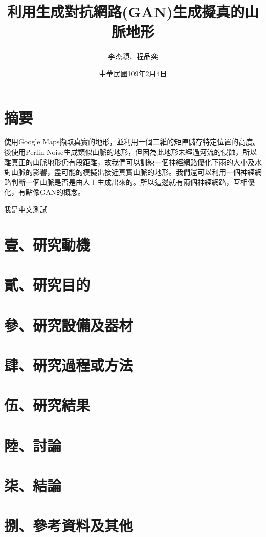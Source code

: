 \documentclass[16pt]{extarticle}
\title{利用生成對抗網路(GAN)生成擬真的山脈地形}
\author{李杰穎、程品奕}
\date{中華民國109年2月4日}
\begin{document}
\maketitle

\section*{摘要}
使用Google Maps擷取真實的地形，並利用一個二維的矩陣儲存特定位置的高度。後使用Perlin Noise生成類似山脈的地形，但因為此地形未經過河流的侵蝕，所以離真正的山脈地形仍有段距離，故我們可以訓練一個神經網路優化下雨的大小及水對山脈的影響，盡可能的模擬出接近真實山脈的地形。我們還可以利用一個神經網路判斷一個山脈是否是由人工生成出來的。所以這邊就有兩個神經網路，互相優化，有點像GAN的概念。

我是中文測試
\section*{壹、研究動機}
\section*{貳、研究目的}
\section*{參、研究設備及器材}
\section*{肆、研究過程或方法}
\section*{伍、研究結果}
\section*{陸、討論}
\section*{柒、結論}
\section*{捌、參考資料及其他}
\end{document}
